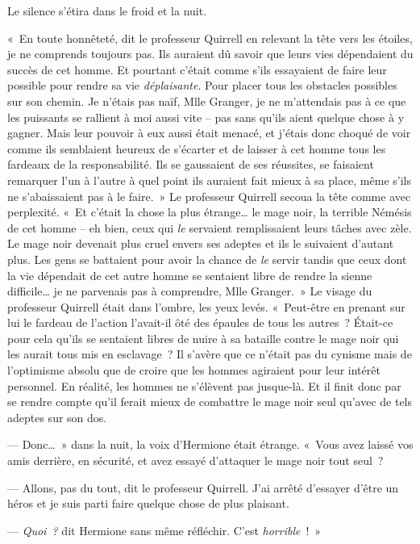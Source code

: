 Le silence s'étira dans le froid et la nuit.

«~En toute honnêteté, dit le professeur Quirrell en relevant la tête vers les étoiles, je ne comprends toujours pas. Ils auraient dû savoir que leurs vies dépendaient du succès de cet homme. Et pourtant c'était comme s'ils essayaient de faire leur possible pour rendre sa vie \emph{déplaisante}. Pour placer tous les obstacles possibles sur son chemin. Je n'étais pas naïf, Mlle Granger, je ne m'attendais pas à ce que les puissants se rallient à moi aussi vite -- pas sans qu'ils aient quelque chose à y gagner. Mais leur pouvoir à eux aussi était menacé, et j'étais donc choqué de voir comme ils semblaient heureux de s'écarter et de laisser à cet homme tous les fardeaux de la responsabilité. Ils se gaussaient de ses réussites, se faisaient remarquer l'un à l'autre à quel point ils auraient fait mieux à sa place, même s'ils ne s'abaissaient pas à le faire.~» Le professeur Quirrell secoua la tête comme avec perplexité. «~Et c'était la chose la plus étrange… le mage noir, la terrible Némésis de cet homme -- eh bien, ceux qui \emph{le} servaient remplissaient leurs tâches avec zèle. Le mage noir devenait plus cruel envers ses adeptes et ils le suivaient d'autant plus. Les gens se battaient pour avoir la chance de \emph{le} servir tandis que ceux dont la vie dépendait de cet autre homme se sentaient libre de rendre la sienne difficile… je ne parvenais pas à comprendre, Mlle Granger.~» Le visage du professeur Quirrell était dans l'ombre, les yeux levés. «~Peut-être en prenant sur lui le fardeau de l'action l'avait-il ôté des épaules de tous les autres~? Était-ce pour cela qu'ils se sentaient libres de nuire à sa bataille contre le mage noir qui les aurait tous mis en esclavage~? Il s'avère que ce n'était pas du cynisme mais de l'optimisme absolu que de croire que les hommes agiraient pour leur intérêt personnel. En réalité, les hommes ne s'élèvent pas jusque-là. Et il finit donc par se rendre compte qu'il ferait mieux de combattre le mage noir seul qu'avec de tels adeptes sur son dos.

--- Donc…~» dans la nuit, la voix d'Hermione était étrange. «~Vous avez laissé vos amis derrière, en sécurité, et avez essayé d'attaquer le mage noir tout seul~?

--- Allons, pas du tout, dit le professeur Quirrell. J'ai arrêté d'essayer d'être un héros et je suis parti faire quelque chose de plus plaisant.

--- \emph{Quoi~?} dit Hermione sans même réfléchir. C'est \emph{horrible}~!~»

